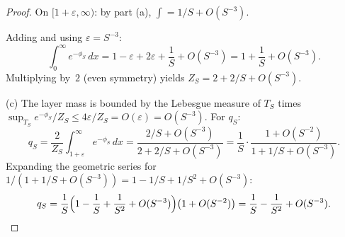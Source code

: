 \begin{proof}
On $[1+\varepsilon,\infty)$: by part (a), $\int=1/S+O(S^{-3})$.

Adding and using $\varepsilon=S^{-3}$:
\[
  \int_0^{\infty}e^{-\phi_S}\,dx
  =1-\varepsilon+2\varepsilon+\frac{1}{S}+O(S^{-3})
  =1+\frac{1}{S}+O(S^{-3}).
\]
Multiplying by~$2$ (even symmetry) yields $Z_S=2+2/S+O(S^{-3})$.

(c) The layer mass is bounded by the Lebesgue measure of $T_S$ times
$\sup_{T_S}e^{-\phi_S}/Z_S\le 4\varepsilon/Z_S=O(\varepsilon)=O(S^{-3})$. For
$q_S$:
\[
  q_S=\frac{2}{Z_S}\int_{1+\varepsilon}^{\infty}e^{-\phi_S}\,dx
  =\frac{2/S+O(S^{-3})}{2+2/S+O(S^{-3})}
  =\frac{1}{S}\cdot\frac{1+O(S^{-2})}{1+1/S+O(S^{-3})}.
\]
Expanding the geometric series for $1/(1+1/S+O(S^{-3}))=
1-1/S+1/S^2+O(S^{-3})$:
\[
  q_S=\frac{1}{S}\Bigl(1-\frac{1}{S}+\frac{1}{S^2}+O(S^{-3})\Bigr)\bigl(1+O(S^{-2})\bigr)
   =\frac{1}{S}-\frac{1}{S^2}+O(S^{-3}).\qedhere
\]
\end{proof}
